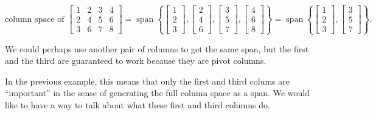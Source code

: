 \documentclass{ximera}
\begin{document}
\begin{exampleSol}
    \begin{equation*}
        \text{column space of }
        \begin{bmatrix}
            1 & 2 & 3 & 4 \\
            2 & 4 & 5 & 6 \\
            3 & 6 & 7 & 8
        \end{bmatrix}
        = \operatorname{span}
        \left\{
            \begin{bmatrix}
                1 \\
                2 \\
                3 
            \end{bmatrix}
            ,
            \begin{bmatrix}
                2 \\
                4 \\
                6
            \end{bmatrix}
            ,
            \begin{bmatrix}
                3 \\
                5 \\
                7
            \end{bmatrix}
            ,
            \begin{bmatrix}
                4 \\
                6 \\
                8
            \end{bmatrix}
        \right\}
        = \operatorname{span}
        \left\{
            \begin{bmatrix}
                1 \\
                2 \\
                3
            \end{bmatrix}
            ,
            \begin{bmatrix}
                3 \\
                5 \\
                7
            \end{bmatrix}
        \right\} .
    \end{equation*}
\end{exampleSol}
We could perhaps use another pair of columns to get the same span, but the first and the third are guaranteed to work because they are pivot columns. 

In the previous example, this means that only the first and third colums are ``important'' in the sense of generating the full column space as a span. We would like to have a way to talk about what these first and third columns do.
\end{document}
